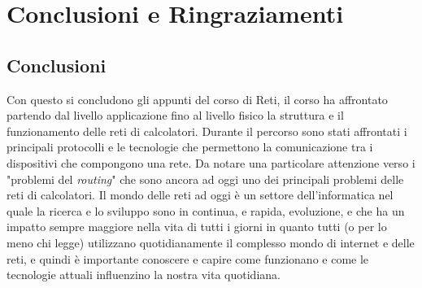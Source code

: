 \documentclass[twoside]{report}
\begin{document}
    
    
    
    
    

    \chapter*{Conclusioni e Ringraziamenti}
    \thispagestyle{chapterInit}
    
    \section*{Conclusioni}
    Con questo si concludono gli appunti del corso di Reti, il corso ha affrontato partendo dal livello applicazione fino al livello fisico la struttura e il funzionamento delle reti di calcolatori. Durante il percorso sono stati affrontati i principali protocolli e le tecnologie che permettono la comunicazione tra i dispositivi che compongono una rete. Da notare una particolare attenzione verso i "problemi del \textit{routing}" che sono ancora ad oggi uno dei principali problemi delle reti di calcolatori. Il mondo delle reti ad oggi è un settore dell'informatica nel quale la ricerca e lo sviluppo sono in continua, e rapida, evoluzione, e che ha un impatto sempre maggiore nella vita di tutti i giorni in quanto tutti (o per lo meno chi legge) utilizzano quotidianamente il complesso mondo di internet e delle reti, e quindi è importante conoscere e capire come funzionano e come le tecnologie attuali influenzino la nostra vita quotidiana.
\end{document}
